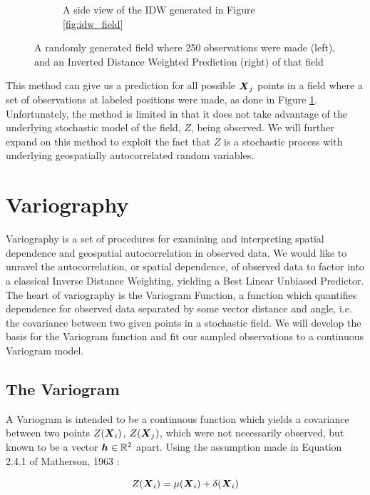 \documentclass[11pt]{ucthesis}
\newcommand{\vect}[1]{{\it{\boldsymbol{#1}}}}
\begin{document}
\begin{figure}[!]
\begin{subfigure}[t]{0.5\textwidth}
        \captionsetup{skip=0.5\baselineskip, width=0.8\textwidth, size=footnotesize}
        \caption{A side view of the IDW generated in Figure \ref{fig:idw_field}}
    \end{subfigure}
    \captionsetup{skip=0.5\baselineskip,size=footnotesize}
    \caption{A randomly generated field where 250 observations were made (left), and an Inverted Distance Weighted Prediction (right) of that field}
    \label{fig:idw_side_by_side}
\end{figure}

This method can give us a prediction for all possible $\vect{X}_j$ points in a field where a set of observations at labeled positions were made, as done in Figure \ref{fig:idw_side_by_side}. Unfortunately, the method is limited in that it does not take advantage of the underlying stochastic model of the field, $Z$, being observed. We will further expand on this method to exploit the fact that $Z$ is a stochastic process with underlying geospatially autocorrelated random variables.

\section{Variography}
Variography is a set of procedures for examining and interpreting spatial dependence and geospatial autocorrelation in observed data. We would like to unravel the autocorrelation, or spatial dependence, of observed data to factor into a classical Inverse Distance Weighting, yielding a Best Linear Unbiased Predictor. The heart of variography is the Variogram Function, a function which quantifies dependence for observed data separated by some vector distance and angle, i.e. the covariance between two given points in a stochastic field. We will develop the basis for the Variogram function and fit our sampled observations to a continuous Variogram model.

\subsection{The Variogram}
A Variogram is intended to be a continuous function which yields a covariance between two points $Z(\vect{X}_{i})$, $Z(\vect{X}_{j})$, which were not necessarily observed, but known to be a vector $\vect{h} \in \mathbb{R}^2$ apart. Using the assumption made in Equation 2.4.1 of Matherson, 1963 \cite{matheron:geostat}:

\begin{equation}
    Z(\vect{X}_i)=\mu(\vect{X}_i)+\delta(\vect{X}_i)
    \label{eq:matheron:assum}
\end{equation}
\end{document}
